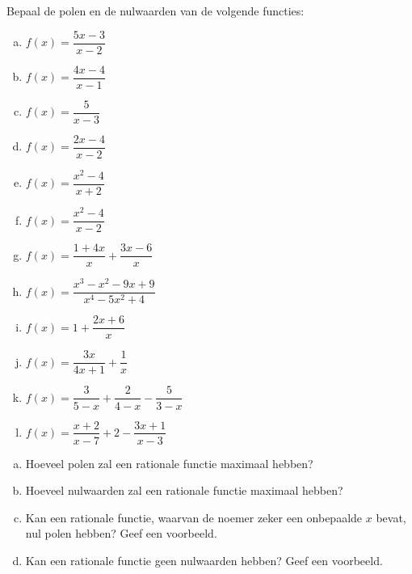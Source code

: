 \documentclass[12pt]{article}
\begin{document}
\begin{oefening}
Bepaal de polen en de nulwaarden van de volgende functies:
\begin{multicols}{2}
\begin{enumerate}[(a)]
  \itemsep1em
  \item $f(x)=\dfrac{5x-3}{x-2}$
  \item $f(x)=\dfrac{4x-4}{x-1}$
  \item $f(x)=\dfrac{5}{x-3}$
  \item $f(x)=\dfrac{2x-4}{x-2}$
  \item $f(x)=\dfrac{x^2-4}{x+2}$
  \item $f(x)=\dfrac{x^2-4}{x-2}$
  \item $f(x)=\dfrac{1+4x}{x}+\dfrac{3x-6}{x}$
  \item $f(x)=\dfrac{x^3-x^2-9x+9}{x^4-5x^2+4}$
  \item $f(x)=1+\dfrac{2x+6}{x}$
  \item $f(x)=\dfrac{3x}{4x+1}+\dfrac{1}{x}$
  \item $f(x)=\dfrac{3}{5-x}+\dfrac{2}{4-x}-\dfrac{5}{3-x}$
  \item $f(x)=\dfrac{x+2}{x-7}+2-\dfrac{3x+1}{x-3}$
\end{enumerate}
\end{multicols}\end{oefening}

\begin{oefening}
\begin{enumerate}[(a)]
  \item Hoeveel polen zal een rationale functie maximaal hebben?
  \item Hoeveel nulwaarden zal een rationale functie maximaal hebben?
  \item Kan een rationale functie, waarvan de noemer zeker een onbepaalde $x$ bevat, nul polen hebben? Geef een voorbeeld.
  \item Kan een rationale functie geen nulwaarden hebben? Geef een voorbeeld.
\end{enumerate}
\end{oefening}
\end{document}
